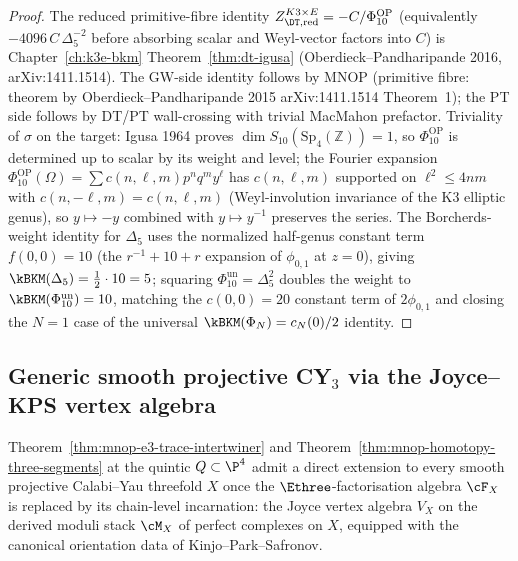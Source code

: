 \begin{proof}
The reduced primitive-fibre identity
\(Z^{K3\times E}_{\DT, \mathrm{red}} = -C/\Phi_{10}^{\mathrm{OP}}\)
(equivalently \(-4096\,C\,\Delta_5^{-2}\) before absorbing scalar and
Weyl-vector factors into \(C\)) is
Chapter~\ref{ch:k3e-bkm} Theorem~\ref{thm:dt-igusa} (Oberdieck--Pandharipande
2016, arXiv:1411.1514). The GW-side identity follows by MNOP
(primitive fibre: theorem by Oberdieck--Pandharipande 2015
arXiv:1411.1514 Theorem~1); the PT side follows by DT/PT wall-crossing
with trivial MacMahon prefactor. Triviality of $\sigma$ on the target:
Igusa 1964 proves $\dim S_{10}(\mathrm{Sp}_4(\mathbb{Z})) = 1$, so
\(\Phi_{10}^{\mathrm{OP}}\) is determined up to scalar by its weight and level; the
Fourier expansion
\(\Phi_{10}^{\mathrm{OP}}(\Omega) = \sum c(n, \ell, m) p^n q^m y^\ell\) has
$c(n, \ell, m)$ supported on $\ell^2 \leq 4nm$ with
$c(n, -\ell, m) = c(n, \ell, m)$ (Weyl-involution invariance of the K3
elliptic genus), so $y\mapsto -y$ combined with $y\mapsto y^{-1}$
preserves the series. The Borcherds-weight identity for $\Delta_5$ uses
the normalized half-genus constant term $f(0, 0) = 10$ (the
$r^{-1} + 10 + r$ expansion of $\phi_{0,1}$ at $z = 0$), giving
$\kBKM(\Delta_5) = \tfrac{1}{2}\cdot 10 = 5$; squaring
\(\Phi_{10}^{\mathrm{un}}=\Delta_5^2\) doubles the weight to
\(\kBKM(\Phi_{10}^{\mathrm{un}}) = 10\), matching the \(c(0, 0) = 20\) constant term of
$2\phi_{0,1}$ and closing the $N = 1$ case of the universal
$\kBKM(\Phi_N) = c_N(0)/2$ identity.
\end{proof}

\subsection{Generic smooth projective CY\texorpdfstring{$_3$}{3} via the Joyce--KPS vertex algebra}
\label{subsec:mnop-generic-cy3-joyce-kps}

Theorem~\ref{thm:mnop-e3-trace-intertwiner} and
Theorem~\ref{thm:mnop-homotopy-three-segments} at the quintic $Q\subset\P^4$
admit a direct extension to every smooth projective Calabi--Yau threefold
$X$ once the $\Ethree$-factorisation algebra $\cF_X$ is replaced by its
chain-level incarnation: the Joyce vertex algebra $V_X$ on the derived
moduli stack $\cM_X$ of perfect complexes on $X$, equipped with the
canonical orientation data of Kinjo--Park--Safronov.

